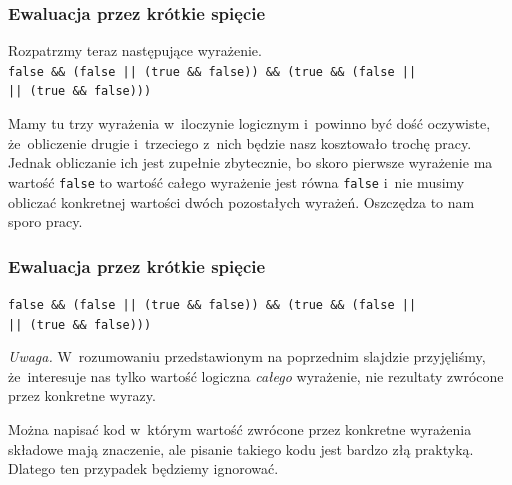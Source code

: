 \documentclass[10pt,t]{beamer}
\begin{document}
\begin{frame}
  \frametitle{Ewaluacja przez krótkie spięcie}


  Rozpatrzmy teraz następujące wyrażenie. \\
  \texttt{false \&\& (false || (true \&\& false)) \&\& (true \&\&
    (false || \\ }
  \hphantom{aaaa}\texttt{|| (true \&\& false)))}

  Mamy tu trzy wyrażenia w~iloczynie logicznym i~powinno być dość
  oczywiste, że~obliczenie drugie i~trzeciego z~nich będzie
  nasz kosztowało trochę pracy. Jednak obliczanie ich jest zupełnie
  zbytecznie, bo skoro pierwsze wyrażenie ma wartość \texttt{false} to
  wartość całego wyrażenie jest równa \texttt{false} i~nie musimy obliczać
  konkretnej wartości dwóch pozostałych wyrażeń. Oszczędza to nam sporo
  pracy.

\end{frame}





\begin{frame}
  \frametitle{Ewaluacja przez krótkie spięcie}


  \texttt{false \&\& (false || (true \&\& false)) \&\& (true \&\&
    (false || \\ }
  \hphantom{aaaa}\texttt{|| (true \&\& false)))}

  \textit{Uwaga.} W~rozumowaniu przedstawionym na poprzednim slajdzie
  przyjęliśmy, że~interesuje nas tylko wartość logiczna \textit{całego}
  wyrażenie, nie rezultaty zwrócone przez konkretne wyrazy.

  Można napisać kod w~którym wartość zwrócone przez konkretne wyrażenia
  składowe mają znaczenie, ale pisanie takiego kodu jest bardzo złą
  praktyką. Dlatego ten przypadek będziemy ignorować.

\end{frame}
\end{document}
